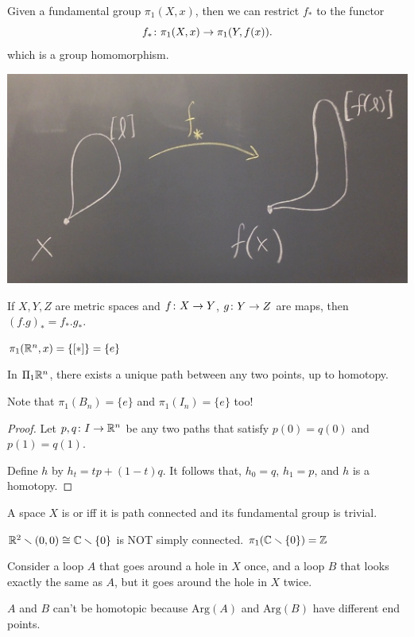 \documentclass[11pt,leqno,oneside]{amsart}
\numberwithin{thm}{section}
\newcommand{\minus}{\smallsetminus}
\newcommand{\fund}{\pi_1}
\newcommand{\Arg}{\text{Arg}}
\begin{document}
\begin{prop}
  Given a fundamental group $\fund(X, x)$, then we can restrict $f_*$
  to the functor $$f_* \from \fund(X, x) \to \fund(Y, f(x)).$$ which is a group homomorphism.

  \includegraphics[scale=0.17]{images/fundamental-functor}
\end{prop}
\begin{prop}
  If $X,Y,Z$ are metric spaces and $f \colon X \to Y$, $g \colon Y \to Z$ are
  maps, then ${(f.g)}_* = f_*.g_*$.
\end{prop}

\begin{example}
  $\fund(\R^n, x) = \{[*]\} = \{e\}$

  In $\Pi_1 {\mathbb R}^n$, there exists a unique path between any two points,
  up to homotopy.

  Note that $\fund(B_n) = \{e\}$ and $\fund(I_n) = \{e\}$ too!
\end{example}
\begin{proof}
  Let $p,q \colon I \to {\mathbb R}^n$ be any two paths that satisfy $p(0) = q(0)$ and $p(1) = q(1)$.

  Define $h$ by $h_t = tp + (1-t)q$.  It follows that, $h_0 = q$, $h_1 = p$, and $h$ is a homotopy.
\end{proof}

\begin{defn} %
  A space $X$ is  or  iff it is path connected and its
  fundamental group is trivial.
\end{defn}
\begin{example}
  $\R^2 \minus (0,0) \isom \C \minus \{0\}$ is NOT simply connected.
  $\fund(\C \minus \{0\}) = \Z$
\end{example}
\begin{example}
  Consider a loop $A$ that goes around a hole in $X$ once, and a loop $B$ that looks exactly the same as $A$, but it goes around the hole in $X$ twice.

  $A$ and $B$ can't be homotopic because $\Arg(A)$ and $\Arg(B)$ have
  different end points.
\end{example}
\end{document}
